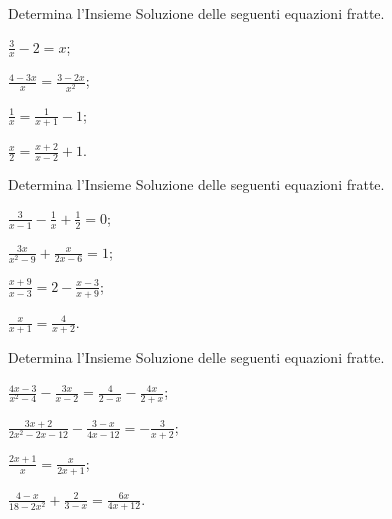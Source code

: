 \begin{esercizio}[\Ast]
\label{ese:3.36}
Determina l'Insieme Soluzione delle seguenti equazioni fratte.
\begin{multicols}{2}
\begin{enumeratea}
\item $\frac{3}{x}-2 = x$;
\item $\frac{4-3 x}{x}=\frac{3-2 x}{x^{2}}$;
\item $\frac{1}{x} = \frac{1}{x + 1}-1$;
\item $\frac{x}{2} = \frac{x + 2}{x-2} + 1$.
\end{enumeratea}
\end{multicols}
\end{esercizio}

\begin{esercizio}[\Ast]
\label{ese:3.37}
Determina l'Insieme Soluzione delle seguenti equazioni fratte.
\begin{multicols}{2}
\begin{enumeratea}
\item $\frac{3}{x-1}-\frac{1}{x} + \frac{1}{2} = 0$;
\item $\frac{3 x}{x^{2}-9} + \frac{x}{2 x-6}=1$;
\item $\frac{x + 9}{x-3}=2-\frac{x-3}{x + 9}$;
\item $\frac{x}{x + 1} = \frac{4}{x + 2}$.
\end{enumeratea}
\end{multicols}
\end{esercizio}

 \begin{esercizio}[\Ast]
\label{ese:3.38}
Determina l'Insieme Soluzione delle seguenti equazioni fratte.
\begin{multicols}{2}
\begin{enumeratea}
\item $\frac{4 x-3}{x^{2}-4}-\frac{3 x}{x-2} = \frac{4}{2-x}-\frac{4 x}{2 + x}$;
\item $\frac{3 x + 2}{2 x^{2}-2 x-12}-\frac{3-x}{4 x-12} = - \frac{3}{x + 2}$;
\item $\frac{2 x + 1}{x} = \frac{x}{2 x + 1}$;
\item $\frac{4-x}{18-2 x^{2}} + \frac{2}{3-x} = \frac{6 x}{4 x +12}$.
\end{enumeratea}
\end{multicols}
 \end{esercizio}

